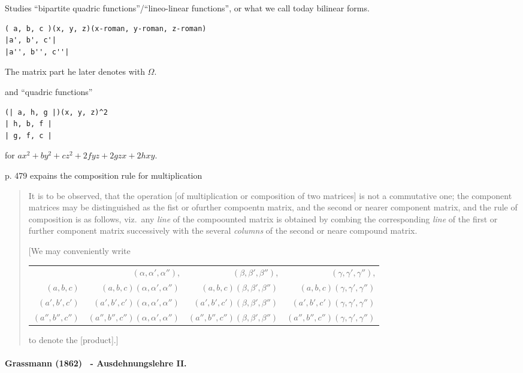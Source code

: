Studies ``bipartite quadric functions''/``lineo-linear functions'', or what we
call today bilinear forms.

\begin{verbatim}
( a, b, c )(x, y, z)(x-roman, y-roman, z-roman)
|a', b', c'|
|a'', b'', c''|
\end{verbatim}

The matrix part he later denotes with $\Omega$.

and ``quadric functions''

\begin{verbatim}
(| a, h, g |)(x, y, z)^2
| h, b, f |
| g, f, c |
\end{verbatim}

for $ax^2 + by^2 + cz^2 + 2fyz + 2gzx + 2hxy$.

p. 479 expains the composition rule for multiplication

\begin{quote}
    It is to be observed, that the operation [of multiplication or composition of
    two matrices] is not a commutative one; the component matrices may be
    distinguished as the fist or ofurther compoentn matrix, and the second or
    nearer component matrix, and the rule of composition is as follows, viz.\ any
    \textit{line} of the compoounted matrix is obtained by combing the corresponding
    \textit{line} of the first or further component matrix successively with the several
    \textit{columns} of the second or neare compound matrix.

    [We may conveniently write

    \begin{tabular}{r|rrr}
    \multicolumn{1}{r}{} & $(\alpha,\alpha',\alpha'')$, & $(\beta,\beta',\beta'')$, & $(\gamma,\gamma',\gamma'')$,\tabularnewline
    \cline{2-4}
    $(a,b,c)$ & $(a,b,c)\!\!(\alpha,\alpha',\alpha'')$ & $(a,b,c)\!\!(\beta,\beta',\beta'')$ & $(a,b,c)\!\!(\gamma,\gamma',\gamma'')$\tabularnewline
    $(a',b',c')$ & $(a',b',c')\!\!(\alpha,\alpha',\alpha'')$ & $(a',b',c')\!\!(\beta,\beta',\beta'')$ & $(a',b',c')\!\!(\gamma,\gamma',\gamma'')$\tabularnewline
    $(a'',b'',c'')$ & $(a'',b'',c'')\!\!(\alpha,\alpha',\alpha'')$ & $(a'',b'',c'')\!\!(\beta,\beta',\beta'')$ & $(a'',b'',c'')\!\!(\gamma,\gamma',\gamma'')$\tabularnewline
    \end{tabular}

    to denote the [product].]
\end{quote}


\paragraph{Grassmann (1862)~\cite{Grassmann1862,Grassmann2000} - Ausdehnungslehre II.}

